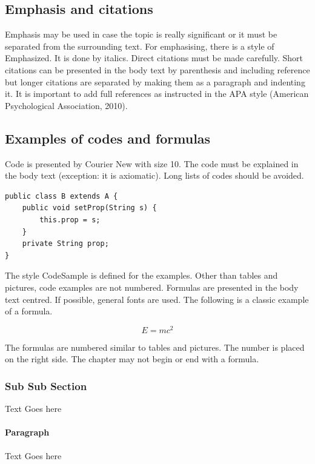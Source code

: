 \documentclass[a4paper,12pt]{article}
\begin{document}
\subsection{Emphasis and citations}
Emphasis may be used in case the topic is really significant or it must be separated from the surrounding text. For emphasising, there is a style of Emphasized. It is done by italics.
Direct citations must be made carefully. Short citations can be presented in the body text by parenthesis and including reference but longer citations are separated by making them as a paragraph and indenting it. It is important to add full references as instructed in the APA style (American Psychological Association, 2010).

\subsection{Examples of codes and formulas}
Code is presented by Courier New with size 10. The code must be explained in the body text (exception: it is axiomatic). Long lists of codes should be avoided.

\begin{verbatim}
public class B extends A {	
    public void setProp(String s) {
        this.prop = s;
    }
    private String prop;
}
\end{verbatim}

The style CodeSample is defined for the examples. Other than tables and pictures, code examples are not numbered.
Formulas are presented in the body text centred. If possible, general fonts are used. The following is a classic example of a formula.

\begin{equation}
    E = mc^2
\end{equation}

The formulas are numbered similar to tables and pictures. The number is placed on the right side. The chapter may not begin or end with a formula.
\subsubsection{Sub Sub Section}
Text Goes here

\paragraph{Paragraph}
Text Goes here

\newpage
\end{document}
